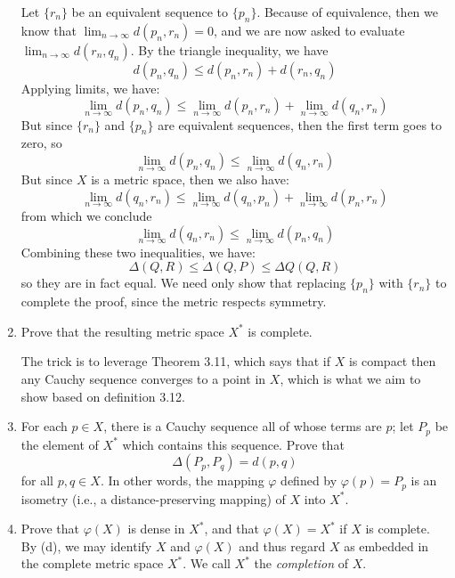 \documentclass[10pt]{article}
\begin{document}
\begin{problem}
\begin{enumerate}[label=\alph*)]
				\begin{solution}
					Let \( \{r_n\} \) be an equivalent sequence to \( \{p_n\} \). Because of equivalence,
					then we know that \( \lim_{n \to \infty}d(p_n, r_n) = 0 \), and we are now asked to
					evaluate \( \lim_{n \to \infty}d(r_n, q_n) \). By the triangle inequality, we have
					\[
						d(p_n, q_n) \leq d(p_n, r_n) + d(r_n, q_n)
					\]
					Applying limits, we have:
					\[
						\lim_{n \to \infty}d(p_n, q_n) \leq \lim_{n \to \infty} d(p_n, r_n) + \lim_{n \to
						\infty}d(q_n, r_n)
					\]
					But since \( \{r_n\} \) and \( \{p_n\} \) are equivalent sequences, then the first term
					goes to zero, so 
					\[
						\lim_{n \to \infty} d(p_n, q_n) \leq \lim_{n \to \infty} d(q_n, r_n)
					\]
					But since \( X \) is a metric space, then we also have:
					\[
						\lim_{n \to \infty}d(q_n, r_n) \leq \lim_{n \to \infty}d(q_n, p_n) + \lim_{n \to
						\infty} d(p_n, r_n)
					\]
					from which we conclude
					\[
						\lim_{n \to \infty}d(q_n, r_n) \leq \lim_{n \to \infty}d(p_n, q_n)
					\]
					Combining these two inequalities, we have:
					\[
						\Delta(Q, R) \leq \Delta(Q, P) \leq \Delta Q(Q, R)
					\]
					so they are in fact equal. We need only show that replacing \( \{p_n\} \) with \( \{
					r_n\} \) to complete the proof, since the metric respects symmetry.
				\end{solution}
			\item Prove that the resulting metric space \( X^{*} \) is complete. 


				\begin{solution}
					The trick is to leverage Theorem 3.11, which says that if \( X \) is compact then any
					Cauchy sequence converges to a point in \( X \), which is what we aim to show based on
					definition 3.12. 
				\end{solution}
			\item For each \( p\in X \), there is a Cauchy sequence all of whose terms are \( p \); let \( P_p \) 
				be the element of \( X^{*} \) which contains this sequence. Prove that 
				\[
				\Delta(P_p, P_q) = d(p, q)
				\] 
				for all \( p, q \in X \). In other words, the mapping \( \varphi \) defined by \( \varphi(p) = P_p \) 
				is an isometry (i.e., a distance-preserving mapping) of \( X \) into \( X^{*} \). 
			\item Prove that \( \varphi(X) \) is dense in \( X^{*} \), and that \( \varphi(X) = X^{*} \) if 
				\( X \) is complete. By (d), we may identify \( X \) and \( \varphi(X) \) and thus regard \( X \) 
				as embedded in the complete metric space \( X^{*} \). We call \( X^{*} \) the 
				\textit{completion} of \( X \).
		\end{enumerate}
	\end{problem}
\end{document}
